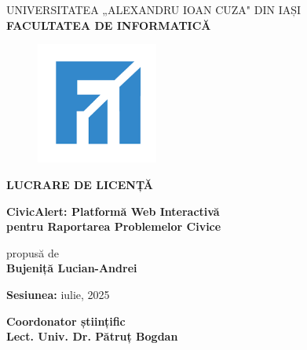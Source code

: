 \documentclass[12pt,a4paper]{report}
\begin{document}
\begin{titlepage}
\begin{center}
\large
UNIVERSITATEA „ALEXANDRU IOAN CUZA" DIN IAȘI\\
\vspace{0.5cm}
\textbf{FACULTATEA DE INFORMATICĂ}\\
\vspace{2cm}

\begin{figure}[h]
\centering
\includegraphics[width=4cm]{logo_uaic.png}
\end{figure}
\vspace{2cm}

\Large
\textbf{LUCRARE DE LICENȚĂ}\\
\vspace{1.5cm}

\huge
\textbf{CivicAlert: Platformă Web Interactivă\\pentru Raportarea Problemelor Civice}\\
\vspace{1cm}

\large
propusă de\\
\vspace{0.5cm}
\textbf{Bujeniță Lucian-Andrei}\\
\vspace{2cm}

\textbf{Sesiunea:} iulie, 2025\\
\vspace{1cm}

\textbf{Coordonator științific}\\
\textbf{Lect. Univ. Dr.  Pătruț Bogdan}\\

\end{center}
\end{titlepage}
\end{document}
